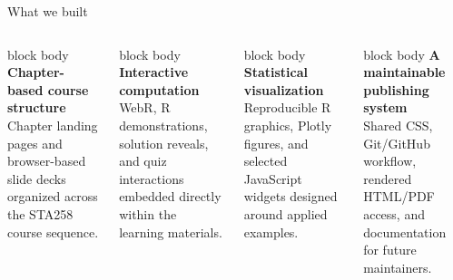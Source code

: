 \documentclass[aspectratio=169,10pt]{beamer}
\begin{document}
\begin{frame}{What we built}
\vspace{0.45em}
\begin{columns}[T,onlytextwidth]
\begin{beamercolorbox}[rounded=true,sep=0.85em,wd=\textwidth]{block body}
\textcolor{UTBlue}{\textbf{Chapter-based course structure}}\\[0.35em]
\small Chapter landing pages and browser-based slide decks organized across the STA258 course sequence.
\end{beamercolorbox}

\vspace{0.7em}
\begin{beamercolorbox}[rounded=true,sep=0.85em,wd=\textwidth]{block body}
\textcolor{Pantone227}{\textbf{Interactive computation}}\\[0.35em]
\small WebR, R demonstrations, solution reveals, and quiz interactions embedded directly within the learning materials.
\end{beamercolorbox}

\begin{beamercolorbox}[rounded=true,sep=0.85em,wd=\textwidth]{block body}
\textcolor{Pantone633}{\textbf{Statistical visualization}}\\[0.35em]
\small Reproducible R graphics, Plotly figures, and selected JavaScript widgets designed around applied examples.
\end{beamercolorbox}

\vspace{0.7em}
\begin{beamercolorbox}[rounded=true,sep=0.85em,wd=\textwidth]{block body}
\textcolor{PantoneWarmRed}{\textbf{A maintainable publishing system}}\\[0.35em]
\small Shared CSS, Git/GitHub workflow, rendered HTML/PDF access, and documentation for future maintainers.
\end{beamercolorbox}
\end{columns}
\end{frame}
\end{document}
